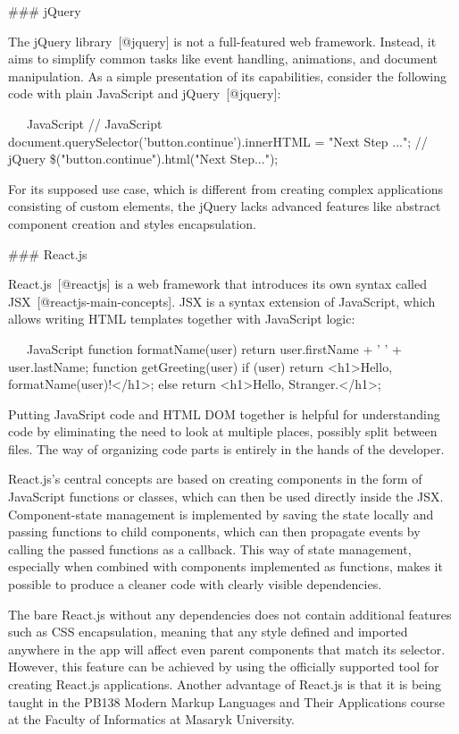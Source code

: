 \documentclass[
  digital, %
  oneside, %
  lof,     %
  nolot,     %
]{fithesis4}
\begin{document}
### jQuery

The jQuery library~[@jquery] is not a full-featured web framework. Instead, it aims to simplify common tasks like event handling, animations, and document manipulation. As a simple presentation of its capabilities, consider the following code with plain JavaScript and jQuery~[@jquery]:

~~~JavaScript
// JavaScript
document.querySelector('button.continue').innerHTML = "Next Step ...";
// jQuery
\$("button.continue").html("Next Step...");
~~~

For its supposed use case, which is different from creating complex applications consisting of custom elements, the jQuery lacks advanced features like abstract component creation and styles encapsulation.

### React.js

React.js~[@reactjs] is a web framework that introduces its own syntax called JSX~[@reactjs-main-concepts]. JSX is a syntax extension of JavaScript, which allows writing HTML templates together with JavaScript logic:

~~~JavaScript
function formatName(user) {
  return user.firstName + ' ' + user.lastName;
}
function getGreeting(user) {
  if (user) return <h1>Hello, {formatName(user)}!</h1>;
  else return <h1>Hello, Stranger.</h1>;
}
~~~

Putting JavaSript code and HTML DOM together is helpful for understanding code by eliminating the need to look at multiple places, possibly split between files. The way of organizing code parts is entirely in the hands of the developer.

React.js's central concepts are based on creating components in the form of JavaScript functions or classes, which can then be used directly inside the JSX. Component-state management is implemented by saving the state locally and passing functions to child components, which can then propagate events by calling the passed functions as a callback. This way of state management, especially when combined with components implemented as functions, makes it possible to produce a cleaner code with clearly visible dependencies.

The bare React.js without any dependencies does not contain additional features such as CSS encapsulation, meaning that any style defined and imported anywhere in the app will affect even parent components that match its selector. However, this feature can be achieved by using the officially supported tool for creating React.js applications. Another advantage of React.js is that it is being taught in the PB138 Modern Markup Languages and Their Applications course at the Faculty of Informatics at Masaryk University.
\end{document}
